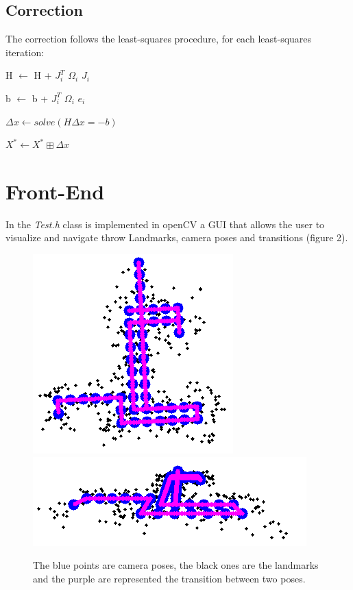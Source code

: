 \documentclass[10pt]{article}
\begin{document}
	\subsection{Correction}
	The correction follows the least-squares procedure, for each least-squares iteration:
	\begin{center}
		H $\leftarrow$ H + $J_{\textit{i}}^{T}$ $\Omega_{\textit{i}}$ $J_{\textit{i}}$		
	
		b $\leftarrow$ b + $J_{\textit{i}}^{T}$ $\Omega_{\textit{i}}$ $e_{\textit{i}}$ 
	
		$\Delta x \leftarrow solve(H\Delta x=-b)$
	
		$X^* \leftarrow X^* \boxplus \Delta x$
	\end{center}
	
	\section{Front-End}
	In the \textit{Test.h} class is implemented in openCV a GUI that allows the user to visualize and navigate throw Landmarks, camera poses and transitions (figure 2). 
	
	\begin{figure}[H]
		\centering
		\includegraphics[width=0.5\linewidth]{img/exact}
		\includegraphics[width=0.8\linewidth]{img/exact2}
		\caption{The blue points are camera poses, the black ones are the landmarks and the purple are represented the transition between two poses.}
		\label{fig:exact}
	\end{figure}
	
\end{document}
